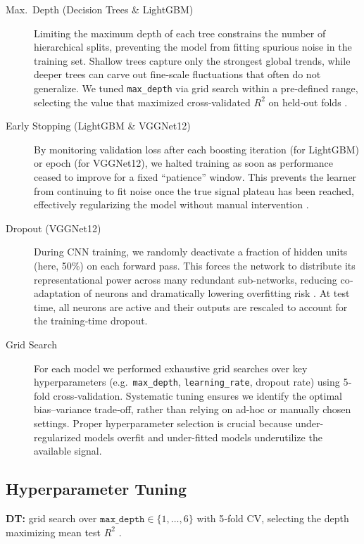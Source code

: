 \documentclass[english,bachelor,oneside]{ctufit-thesis}
\begin{document}
\begin{description}
  \item[Max.\ Depth (Decision Trees \& LightGBM)]  
    Limiting the maximum depth of each tree constrains the number of hierarchical splits, preventing the model from fitting spurious noise in the training set. Shallow trees capture only the strongest global trends, while deeper trees can carve out fine‐scale fluctuations that often do not generalize. We tuned \texttt{max\_depth} via grid search within a pre‐defined range, selecting the value that maximized cross‐validated $R^2$ on held‐out folds \cite{Hastie2009}.

  \item[Early Stopping (LightGBM \& VGGNet12)]  
    By monitoring validation loss after each boosting iteration (for LightGBM) or epoch (for VGGNet12), we halted training as soon as performance ceased to improve for a fixed “patience” window. This prevents the learner from continuing to fit noise once the true signal plateau has been reached, effectively regularizing the model without manual intervention \cite{Prechelt2002early}\cite{Smith2017}.

  \item[Dropout (VGGNet12)]  
    During CNN training, we randomly deactivate a fraction of hidden units (here, 50\%) on each forward pass. This forces the network to distribute its representational power across many redundant sub-networks, reducing co‐adaptation of neurons and dramatically lowering overfitting risk \cite{srivastava2014dropout}. At test time, all neurons are active and their outputs are rescaled to account for the training‐time dropout.

  \item[Grid Search]  
    For each model we performed exhaustive grid searches over key hyperparameters (e.g.\ \texttt{max\_depth}, \texttt{learning\_rate}, dropout rate) using 5‐fold cross‐validation. Systematic tuning ensures we identify the optimal bias–variance trade‐off, rather than relying on ad-hoc or manually chosen settings. Proper hyperparameter selection is crucial because under-regularized models overfit and under-fitted models underutilize the available signal.
\end{description}

\subsection{Hyperparameter Tuning}
\textbf{DT:} grid search over $\texttt{max\_depth}\in\{1,\dots,6\}$ with 5‐fold CV, selecting the depth maximizing mean test $R^2$ \cite{Hastie2009}.  
\end{document}

